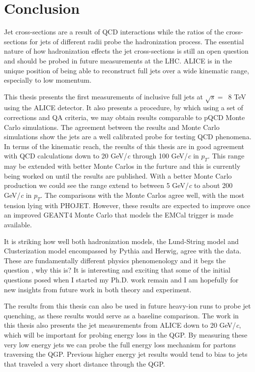 \section{Conclusion}

Jet cross-sections are a result of QCD interactions while the ratios of the cross-sections for jets of different radii probe the hadronization process.  The essential nature of how hadronization effects the jet cross-sections is still an open question and should be probed in future measurements at the LHC.  ALICE is in the unique position of being able to reconstruct full jets over a wide kinematic range, especially to low momentum.

This thesis presents the first measurements of inclusive full jets at $\sqrt{s} = \,$ 8 TeV using the ALICE detector.  It also presents a procedure, by which using a set of corrections and QA criteria, we may obtain results comparable to pQCD Monte Carlo simulations.  The agreement between the results and Monte Carlo simulations show the jets are a well calibrated probe for testing QCD phenomena.  In terms of the kinematic reach, the results of this thesis are in good agreement with QCD calculations down to 20 GeV/\textit{c} through 100 GeV/\textit{c} in $p_{T}$.  This range may be extended with better Monte Carlos in the furture and this is currently being worked on until the results are published.  With a better Monte Carlo production we could see the range extend to between 5 GeV/\textit{c} to about 200 GeV/\textit{c} in $p_{T}$.  The comparisons with the Monte Carlos agree well, with the most tension lying with PHOJET.  However, these results are expected to improve once an improved GEANT4 Monte Carlo that models the EMCal trigger is made available.  

It is striking how well both hadronization models, the Lund-String model and Clusterization model encompassed by Pythia and Herwig, agree with the data.  These are fundamentally different physics phenomenology and it begs the question , why this is?   It is interesting and exciting that some of the initial questions posed when I started my Ph.D. work remain and I am hopefully for new insights from future work in both theory and experiment.  

The results from this thesis can also be used in future heavy-ion runs to probe jet quenching, as these results would serve as a baseline comparison.  The work in this thesis also presents the jet measurements from ALICE down to 20 GeV/\textit{c}, which will be important for probing energy loss in the QGP.  By measuring these very low energy jets we can probe the full energy loss mechanism for partons traversing the QGP.  Previous higher energy jet results would tend to bias to jets that traveled a very short distance through the QGP.

